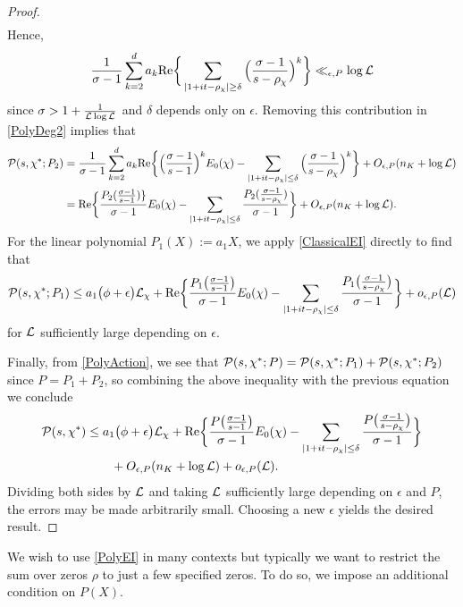 \documentclass[12pt,psamsfonts]{amsart}
\theoremstyle{definition}
\theoremstyle{remark}
\numberwithin{equation}{section}
\begin{document}
\begin{proof}
\begin{align*}
\end{align*}
Hence, 
\[
\frac{1}{\sigma-1} \sum_{k=2}^d a_k \mathrm{Re}\bigg\{ \sum_{|1+it-\rho_{\chi}| \geq \delta} \Big( \frac{\sigma-1}{s-\rho_{\chi} } \Big)^k \bigg\} \ll_{\epsilon, P} \log \mathcal{L} 
\]
since $\sigma > 1 + \frac{1}{\mathcal{L} \log \mathcal{L}}$ and $\delta$ depends only on $\epsilon$. Removing this contribution in \eqref{PolyDeg2} implies that
\begin{align*}
\mathcal{P}(s,\chi^*; P_2)
& =  \frac{1}{\sigma-1} \sum_{k=2}^d a_k  \mathrm{Re}\bigg\{ \Big( \frac{\sigma-1}{s-1} \Big)^k E_0(\chi) -  \sum_{|1+it-\rho_{\chi}| \leq \delta} \Big( \frac{\sigma-1}{s-\rho_{\chi} } \Big)^k \bigg\}   + O_{\epsilon, P}( n_K + \log \mathcal{L} ) \\
& =  \mathrm{Re}\bigg\{ \frac{ P_2( \frac{\sigma-1}{s-1} ) \} }{\sigma-1} E_0(\chi) -   \sum_{|1+it-\rho_{\chi}| \leq \delta} \frac{P_2( \frac{\sigma-1}{s-\rho_{\chi} }) }{\sigma-1}  \bigg\}   + O_{\epsilon, P}( n_K + \log \mathcal{L} ). 
\end{align*}
For the linear polynomial $P_1(X) := a_1X$, we apply \cref{ClassicalEI} directly to find that
\[
\mathcal{P}(s,\chi^*; P_1) \leq a_1\big( \phi + \epsilon \big) \mathcal{L}_{\chi}  +  \mathrm{Re}\bigg\{ \frac{ P_1\big( \frac{\sigma-1}{s-1}\big)}{\sigma-1} E_0(\chi) -  \sum_{|1+it-\rho_{\chi}| \leq \delta} \frac{P_1\big( \frac{\sigma-1}{s-\rho_{\chi}} \big)}{\sigma-1} \bigg\}  + o_{\epsilon, P}(\mathcal{L}) 
\]
for $\mathcal{L}$ sufficiently large depending on $\epsilon$. 

Finally, from \eqref{PolyAction}, we see that $\mathcal{P}(s, \chi^*; P) = \mathcal{P}(s, \chi^* ; P_1) + \mathcal{P}(s,\chi^*; P_2)$ since $P = P_1 + P_2$, so combining the above inequality with the previous equation we conclude
\begin{align*}
\mathcal{P}(s,\chi^*) 
& \leq a_1\big( \phi + \epsilon \big) \mathcal{L}_{\chi}  +  \mathrm{Re}\bigg\{ \frac{ P\big( \frac{\sigma-1}{s-1}\big)}{\sigma-1} E_0(\chi) -  \sum_{|1+it-\rho_{\chi}| \leq \delta} \frac{P\big( \frac{\sigma-1}{s-\rho_{\chi}} \big)}{\sigma-1} \bigg\}  \\
& \qquad + O_{\epsilon,P}(n_K+ \log \mathcal{L} ) + o_{\epsilon, P}(\mathcal{L}). 
\end{align*}
Dividing both sides by $\mathcal{L}$ and taking $\mathcal{L}$ sufficiently large depending on $\epsilon$ and $P$, the errors may be made arbitrarily small. Choosing a new $\epsilon$ yields the desired result.  
\end{proof}

We wish to use \cref{PolyEI} in many contexts but typically we want to restrict the sum over zeros $\rho$ to just a few specified zeros. To do so, we impose an additional condition on  $P(X)$. 
\end{document}
